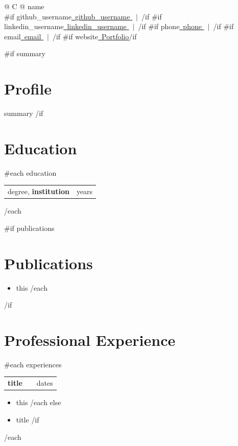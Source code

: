 \documentclass[a4paper,10pt]{article}
\makeatletter
\newenvironment{joblong}[2]
    {
    \begin{tabularx}{\linewidth}{@{}l X r@{}}
    \textbf{#1} & \hfill & #2 \\[3.75pt]
    \end{tabularx}
    \begin{minipage}[t]{\linewidth}
    \begin{itemize}[nosep,after=\strut, leftmargin=1em, itemsep=1pt,label=--]
    }
    {
    \end{itemize}
    \end{minipage}
    }
\makeatother
\begin{document}
\pagestyle{empty}

\begin{tabularx}{\linewidth}{@{} C @{}}
\Huge{ {{name}} } \\[7.5pt]
{{#if github_username}}\href{ {{raw github_username_url}} }{\raisebox{-0.05\height}\faGithub\ {{github_username}} }\ $|$\ {{/if}}%
{{#if linkedin_username}}\href{ {{raw linkedin_username_url}} }{\raisebox{-0.05\height}\faLinkedin\ {{linkedin_username}} }\ $|$\ {{/if}}%
{{#if phone}}\href{ {{raw phone_url}} }{\raisebox{-0.05\height}\faPhone\ {{phone}} }\ $|$\ {{/if}}%
{{#if email}}\href{ {{raw email_url}} }{\raisebox{-0.05\height}\faEnvelope\ {{email}} }\ $|$\ {{/if}}%
{{#if website}}\href{ {{raw website}} }{\raisebox{-0.05\height}\faGlobe\ Portfolio}{{/if}} \\
\end{tabularx}

{{#if summary}}
\section{Profile}
{{summary}}
{{/if}}

\section{Education}
{{#each education}}
\begin{tabularx}{\linewidth}{@{}X r@{}}
{{degree}}, \textbf{ {{institution}} } & \small {{years}} \\
\end{tabularx}
\vspace{2pt}
{{/each}}

{{#if publications}}
\section{Publications}
\begin{itemize}[nosep, leftmargin=1em, itemsep=2pt, label=--]
{{#each publications}}
  \item {{this}}
{{/each}}
\end{itemize}
{{/if}}

\section{Professional Experience}
{{#each experiences}}
\begin{joblong}{ {{title}} }{ {{dates}} }
{{#if bulletPoints}}
{{#each bulletPoints}}
\item {{this}}
{{/each}}
{{else}}
\item {{title}}
{{/if}}
\end{joblong}
{{/each}}
\end{document}
